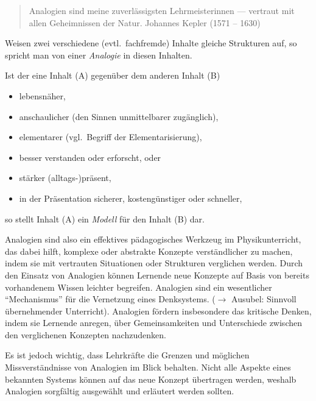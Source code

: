 \begin{quote}
Analogien sind meine zuverl\"{a}ssigsten Lehrmeisterinnen ---
vertraut mit allen Geheimnissen der Natur.
\q\q Johannes Kepler (1571 -- 1630)
\end{quote}

 Weisen zwei verschiedene (evtl.\ fachfremde) Inhalte gleiche
Strukturen auf, so spricht man von einer \textit{Analogie} in diesen
Inhalten.

\bip
Ist der eine Inhalt (A) gegen\"{u}ber dem anderen Inhalt (B)
\begin{itemize}
\setlength{\itemsep}{0mm}
\item
lebensn\"{a}her,
\item
anschaulicher (den Sinnen unmittelbarer zug\"{a}nglich),
\item
elementarer (vgl.\ Begriff der Elementarisierung),
\item
besser verstanden oder erforscht, \q\q oder
\item
st\"{a}rker (alltags-)pr\"{a}sent,
\item
in der Pr\"{a}sentation sicherer, kosteng\"{u}nstiger oder schneller,
\end{itemize}

so stellt Inhalt (A) ein \textit{Modell} f\"{u}r den Inhalt (B) dar.

\bip
Analogien sind also ein effektives p\"{a}dagogisches Werkzeug im Physikunterricht, das dabei hilft, komplexe oder abstrakte Konzepte verst\"{a}ndlicher zu machen, indem sie mit vertrauten Situationen oder Strukturen verglichen werden. Durch den Einsatz von Analogien k\"{o}nnen Lernende neue Konzepte auf Basis von bereits vorhandenem Wissen leichter begreifen. Analogien sind ein wesentlicher ``Mechanismus'' f\"{u}r die Vernetzung eines Denksystems. ($\to$ Ausubel: Sinnvoll \"{u}bernehmender Unterricht). Analogien f\"{o}rdern insbesondere das kritische Denken, indem sie Lernende anregen, \"{u}ber Gemeinsamkeiten und Unterschiede zwischen den verglichenen Konzepten nachzudenken.

\bip
Es ist jedoch wichtig, dass Lehrkr\"{a}fte die Grenzen und m\"{o}glichen Missverst\"{a}ndnisse von Analogien im Blick behalten. Nicht alle Aspekte eines bekannten Systems k\"{o}nnen auf das neue Konzept \"{u}bertragen werden, weshalb Analogien sorgf\"{a}ltig ausgew\"{a}hlt und erl\"{a}utert werden sollten.

\bip
{}

